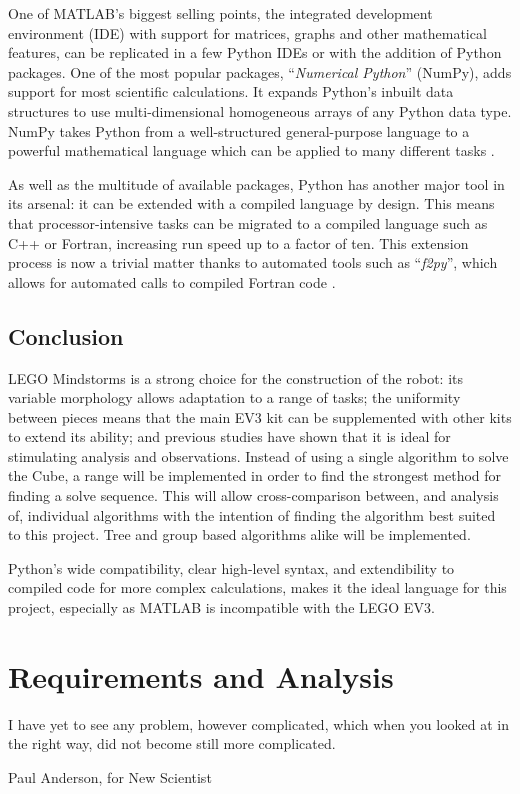 \documentclass{report}
\newcommand{\tit}[1]{\textit{#1}}
\newcommand{\propernoun}[1]{\enquote{\tit{#1}}}
\newcommand{\lego}{LEGO }
\begin{document}
    One of MATLAB's biggest selling points, the integrated development environment (IDE) with support for matrices, graphs and other mathematical features, can be replicated in a few Python IDEs or with the addition of Python packages. One of the most popular packages, \propernoun{Numerical Python} (NumPy), adds support for most scientific calculations. It expands Python's inbuilt data structures to use multi-dimensional homogeneous arrays of any Python data type. NumPy takes Python from a well-structured general-purpose language to a powerful mathematical language which can be applied to many different tasks \cite{Cai2005, Oliphant2006}.
    
    As well as the multitude of available packages, Python has another major tool in its arsenal: it can be extended with a compiled language by design. This means that processor-intensive tasks can be migrated to a compiled language such as C++ or Fortran, increasing run speed up to a factor of ten. This extension process is now a trivial matter thanks to automated tools such as \propernoun{f2py}, which allows for automated calls to compiled Fortran code \cite{Oliphant2006}.
    
    \section{Conclusion}
    \lego Mindstorms is a strong choice for the construction of the robot: its variable morphology allows adaptation to a range of tasks; the uniformity between pieces means that the main EV3 kit can be supplemented with other kits to extend its ability; and previous studies have shown that it is ideal for stimulating analysis and observations. Instead of using a single algorithm to solve the Cube, a range will be implemented in order to find the strongest method for finding a solve sequence. This will allow cross-comparison between, and analysis of, individual algorithms with the intention of finding the algorithm best suited to this project. Tree and group based algorithms alike will be implemented.
    
    Python's wide compatibility, clear high-level syntax, and extendibility to compiled code for more complex calculations, makes it the ideal language for this project, especially as MATLAB is incompatible with the \lego EV3.
   
    \newpage
    \chapter{Requirements and Analysis}
    \epigraph{I have yet to see any problem, however complicated, which when you looked at in the right way, did not become still more complicated.}{Paul Anderson, for New Scientist \cite{Anderson1969}}
    
\end{document}
